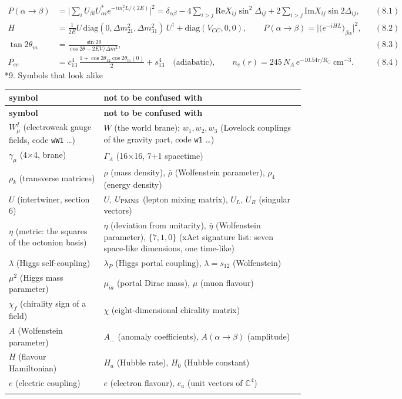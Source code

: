 \documentclass[10pt,a4paper]{article}
\makeatletter
\renewcommand\section{\@startsection{section}{1}{\z@}{-3.5ex \@plus -1ex \@minus -.2ex}{2.3ex \@plus.2ex}{\normalfont\Large\bfseries\raggedright}}
\makeatother
\begin{document}
\begin{align*}
P(\alpha\to\beta)&=\Big|\sum_iU_{\beta i}U^*_{\alpha i}e^{-im_i^2L/(2E)}\Big|^2=\delta_{\alpha\beta}-4\sum_{i>j}\mathrm{Re}X_{ij}\sin^2\Delta_{ij}+2\sum_{i>j}\mathrm{Im}X_{ij}\sin2\Delta_{ij},&&(8.1) \\
H&=\frac1{2E}U\,\mathrm{diag}(0,\Delta m^2_{21},\Delta m^2_{31})\,U^\dagger+\mathrm{diag}(V_{CC},0,0),\qquad P(\alpha\to\beta)=\big|\big(e^{-iHL}\big)_{\beta\alpha}\big|^2,&&(8.2) \\
\tan2\theta_m&=\frac{\sin2\theta}{\cos2\theta-2EV/\Delta m^2},&&(8.3) \\
P_{ee}&=c_{13}^4\,\frac{1+\cos2\theta_{12}\cos2\theta_m(0)}2+s_{13}^4\quad\text{(adiabatic)},\qquad n_e(r)=245\,N_A\,e^{-10.54r/R_\odot}\ \text{cm}^{-3}.&&(8.4)
\end{align*}
\section*{9. Symbols that look alike}
{\small
\begin{longtable}{>{\raggedright\arraybackslash}p{}>{\raggedright\arraybackslash}p{}}
\toprule
\textbf{symbol} & \textbf{not to be confused with} \\
\midrule\endfirsthead
\toprule
\textbf{symbol} & \textbf{not to be confused with} \\
\midrule\endhead
\endfoot
\bottomrule\endlastfoot
$W^I_\mu$ (electroweak gauge fields, code \texttt{wW1} …) & $W$ (the world brane); $w_1,w_2,w_3$ (Lovelock couplings of the gravity part, code \texttt{w1} …) \\
$\gamma_\mu$ (4×4, brane) & $\Gamma_A$ (16×16, 7+1 spacetime) \\
$\rho_k$ (transverse matrices) & $\rho$ (mass density), $\bar\rho$ (Wolfenstein parameter), $\rho_4$ (energy density) \\
$U$ (intertwiner, section 6) & $U$, $U_{\rm PMNS}$ (lepton mixing matrix), $U_L$, $U_R$ (singular vectors) \\
$\eta$ (metric: the squares of the octonion basis) & $\eta$ (deviation from unitarity), $\bar\eta$ (Wolfenstein parameter), $\{7,1,0\}$ (xAct signature list: seven space-like dimensions, one time-like) \\
$\lambda$ (Higgs self-coupling) & $\lambda_P$ (Higgs portal coupling), $\lambda=s_{12}$ (Wolfenstein) \\
$\mu^2$ (Higgs mass parameter) & $\mu_{ia}$ (portal Dirac mass), $\mu$ (muon flavour) \\
$\chi_f$ (chirality sign of a field) & $\chi$ (eight-dimensional chirality matrix) \\
$A$ (Wolfenstein parameter) & $A_{\dots}$ (anomaly coefficients), $A(\alpha\to\beta)$ (amplitude) \\
$H$ (flavour Hamiltonian) & $H_a$ (Hubble rate), $H_0$ (Hubble constant) \\
$e$ (electric coupling) & $e$ (electron flavour), $e_a$ (unit vectors of $\mathbb C^4$) \\*
\end{longtable}}
\end{document}
